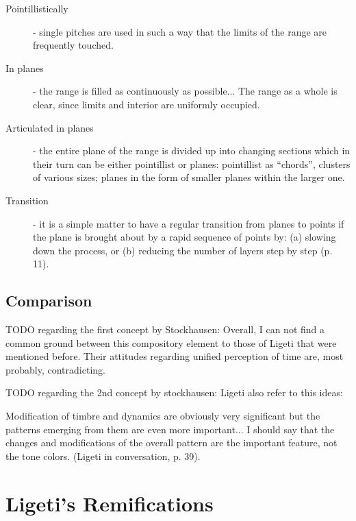 \documentclass[a4paper,11pt]{article}
\newenvironment{MyShadequote}[1][]{%
    \ignorespaces%
    \begin{mdframed}[style=MyShadeQuoteStyle,#1]%
}{%
    \end{mdframed}%
    \ignorespacesafterend%
}%
\begin{document}
\begin{MyShadequote}
  \begin{description}
    \item[Pointillistically] - single pitches are used in such a way that the limits of the range are frequently touched.

    \item[In planes] - the range is filled as continuously as possible...
    The range as a whole is clear, since limits and interior are uniformly occupied.

    \item[Articulated in planes] - the entire plane of the range is divided up into changing sections which in their turn can be either pointillist or planes:
    pointillist as ``chords'', clusters of various sizes;
    planes in the form of smaller planes within the larger one.

    \item[Transition] - it is a simple matter to have a regular transition from planes to points if the plane is brought about by a rapid sequence of points by:
    (a) slowing down the process,
    or (b) reducing the number of layers step by step (p. 11).
  \end{description}

\end{MyShadequote}

\subsection{Comparison}

TODO regarding the first concept by Stockhausen:
Overall, I can not find a common ground between this compository element to those of Ligeti that were mentioned before.
Their attitudes regarding unified perception of time are, most probably, contradicting.

TODO regarding the 2nd concept by stockhausen:
Ligeti also refer to this ideas:

\begin{MyShadequote}
  Modification of timbre and dynamics are obviously very significant but the patterns emerging from them are even more important...
  I should say that the changes and modifications of the overall pattern are the important feature, not the tone colors. (Ligeti in conversation, p. 39).
\end{MyShadequote}

\section{Ligeti's Remifications}
\label{sub:ramifications}
\end{document}
